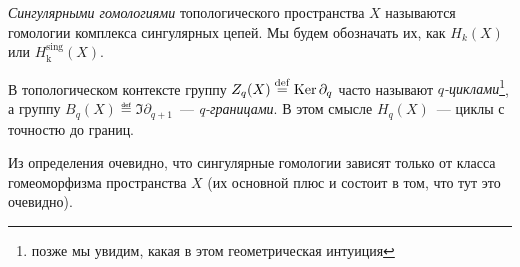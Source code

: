     \begin{definition}
        \emph{Сингулярными гомологиями} топологического пространства $X$ называются гомологии комплекса сингулярных цепей. Мы будем обозначать их, как $H_{k}(X)$ или $H_{\textrm{k}}^{\mathrm{sing}}(X)$.

        В топологическом контексте группу $Z_{q}(X) \stackrel{\mathrm{def}}{=} \operatorname{Ker}{\partial_{q}}$ часто называют \emph{$q$-циклами}\footnote{позже мы увидим, какая в этом геометрическая интуиция},
        а группу $B_{q}(X) \eqdef \Im{\partial_{q + 1}}$~--- \emph{q-границами}. В этом смысле $H_{q}(X)$~--- циклы с точностю до границ.
    \end{definition}
    
    \begin{remark}
       Из определения очевидно, что сингулярные гомологии зависят только от класса гомеоморфизма пространства $X$ (их основной плюс и состоит в том, что тут это очевидно). 
    \end{remark}


    
